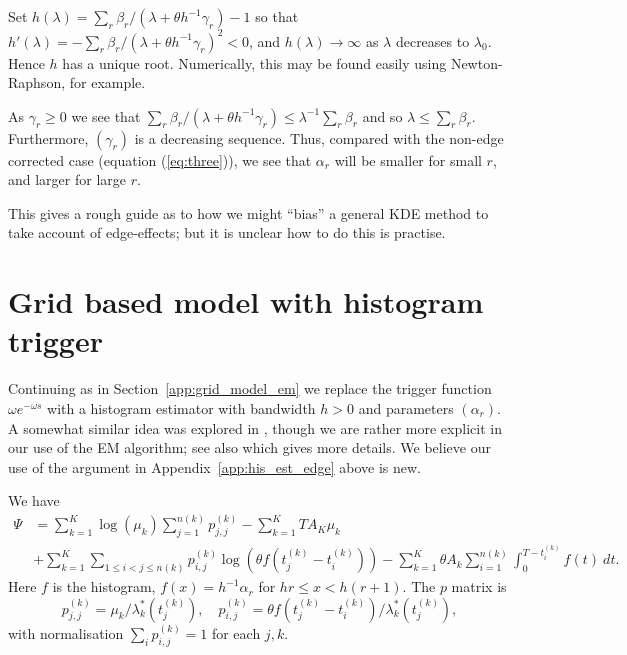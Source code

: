 \documentclass[twoside,a4paper]{article}
\theoremstyle{plain}
\theoremstyle{definition}
\begin{document}
Set $h(\lambda) = \sum_r \beta_r / (\lambda+\theta h^{-1}\gamma_r) - 1$ so that
$h'(\lambda) = - \sum_r \beta_r / (\lambda+\theta h^{-1}\gamma_r)^2 < 0$, and
$h(\lambda)\rightarrow\infty$ as $\lambda$ decreases to $\lambda_0$.
Hence $h$ has a unique root.  Numerically,
this may be found easily using Newton-Raphson, for example.

As $\gamma_r\geq 0$ we see that $\sum_r \beta_r / (\lambda+\theta h^{-1}\gamma_r) \leq \lambda^{-1}
\sum_r \beta_r$ and so $\lambda \leq \sum_r \beta_r$.  Furthermore, $(\gamma_r)$ is a decreasing
sequence.  Thus, compared with the non-edge corrected case (equation (\ref{eq:three})),
we see that $\alpha_r$ will be smaller for small $r$, and larger for large $r$.

This gives a rough guide as to how we might ``bias'' a general KDE method to take account of
edge-effects; but it is unclear how to do this is practise.





\section{Grid based model with histogram trigger}\label{app:grid_hist}

Continuing as in Section~\ref{app:grid_model_em} we replace
the trigger function $\omega e^{-\omega s}$
with a histogram estimator with bandwidth $h>0$ and parameters $(\alpha_r)$.
A somewhat similar idea was explored in \cite{ml2}, though we are rather more explicit
in our use of the EM algorithm; see also \cite{ml} which gives more details.
We believe our use of the argument in Appendix~\ref{app:his_est_edge} above is new.

We have
\begin{align*}
\Psi &= \sum_{k=1}^K \log(\mu_k) \sum_{j=1}^{n(k)} p^{(k)}_{j,j}
  - \sum_{k=1}^K TA_K\mu_k \\
&+\sum_{k=1}^K \sum_{1\leq i<j\leq n(k)} p^{(k)}_{i,j} \log(\theta f(t^{(k)}_j - t^{(k)}_i))
- \sum_{k=1}^K \theta A_k \sum_{i=1}^{n(k)} \int_0^{T-t^{(k)}_i} f(t) \ dt.
\end{align*}
Here $f$ is the histogram, $f(x) = h^{-1}\alpha_r$ for $hr \leq x < h(r+1)$.
The $p$ matrix is
\[ p^{(k)}_{j,j} = \mu_k / \lambda^*_k(t^{(k)}_j), \quad
p^{(k)}_{i,j} = \theta f(t^{(k)}_j - t^{(k)}_i) / \lambda^*_k(t^{(k)}_j), \]
with normalisation $\sum_i p^{(k)}_{i,j} = 1$ for each $j,k$.
\end{document}
